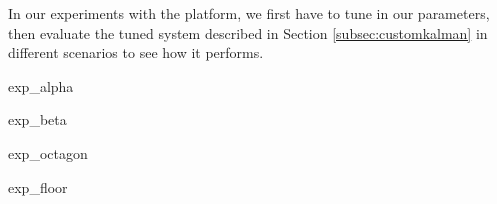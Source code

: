 \documentclass[class=report, crop=false]{standalone}
\begin{document}

In our experiments with the platform, we first have to tune in our parameters, then evaluate the tuned system described in Section \ref{subsec:customkalman} in different scenarios to see how it performs.

{exp_alpha}

{exp_beta}

{exp_octagon}

{exp_floor}
\end{document}
